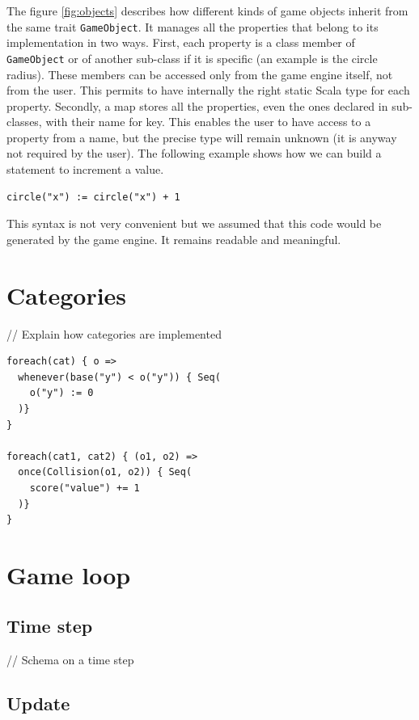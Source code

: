 \documentclass[11pt,a4paper]{article}
\begin{document}
The figure \ref{fig:objects} describes how different kinds of game objects inherit from the same trait \texttt{GameObject}. It manages all the properties that belong to its implementation in two ways. First, each property is a class member of \texttt{GameObject} or of another sub-class if it is specific (an example is the circle radius). These members can be accessed only from the game engine itself, not from the user. This permits to have internally the right static Scala type for each property. Secondly, a map stores all the properties, even the ones declared in sub-classes, with their name for key. This enables the user to have access to a property from a name, but the precise type will remain unknown (it is anyway not required by the user). The following example shows how we can build a statement to increment a value.

\begin{lstlisting}
circle("x") := circle("x") + 1
\end{lstlisting}

This syntax is not very convenient but we assumed that this code would be generated by the game engine. It remains readable and meaningful.


\section{Categories}

// Explain how categories are implemented

\begin{lstlisting}
foreach(cat) { o =>
  whenever(base("y") < o("y")) { Seq(
    o("y") := 0
  )}
}

foreach(cat1, cat2) { (o1, o2) =>
  once(Collision(o1, o2)) { Seq(
    score("value") += 1
  )}  
}
\end{lstlisting}

\section{Game loop}

\subsection{Time step}

// Schema on a time step

\subsection{Update}
\end{document}
